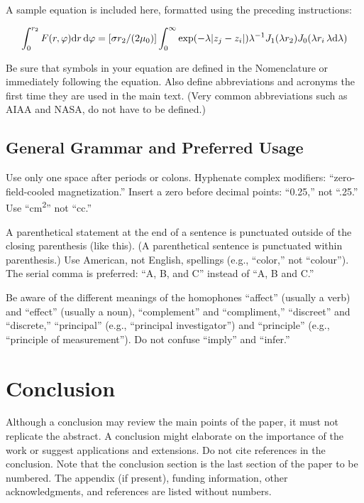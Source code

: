 \documentclass[journal]{new-aiaa}
\begin{document}
A sample equation is included here, formatted using the preceding instructions:

\begin{equation}
\label{sample:equation}
\int^{r_2}_0 F(r,\varphi){\rm d}r\,{\rm d}\varphi = [\sigma r_2/(2\mu_0)]\int^{\infty}_0\exp(-\lambda|z_j-z_i|)\lambda^{-1}J_1 (\lambda r_2)J_0 (\lambda r_i\,\lambda {\rm d}\lambda)
\end{equation}

Be sure that symbols in your equation are defined in the Nomenclature or immediately following the equation. Also define abbreviations and acronyms the first time they are used in the main text. (Very common abbreviations such as AIAA and NASA, do not have to be defined.)

\subsection{General Grammar and Preferred Usage}
Use only one space after periods or colons. Hyphenate complex modifiers: ``zero-field-cooled magnetization.'' Insert a zero before decimal points: ``0.25,'' not ``.25.'' Use ``\si{\centi\meter\squared}'' not ``cc.'' 

A parenthetical statement at the end of a sentence is punctuated outside of the closing parenthesis (like this). (A parenthetical sentence is punctuated within parenthesis.) Use American, not English, spellings (e.g., “color,” not “colour”). The serial comma is preferred: “A, B, and C” instead of “A, B and C.”

Be aware of the different meanings of the homophones “affect” (usually a verb) and “effect” (usually a noun), “complement” and “compliment,” “discreet” and “discrete,” “principal” (e.g., “principal investigator”) and “principle” (e.g., “principle of measurement”). Do not confuse “imply” and “infer.”

\section{Conclusion}
Although a conclusion may review the main points of the paper, it must not replicate the abstract. A conclusion might elaborate on the importance of the work or suggest applications and extensions. Do not cite references in the conclusion. Note that the conclusion section is the last section of the paper to be numbered. The appendix (if present), funding information, other acknowledgments, and references are listed without numbers.
\end{document}
